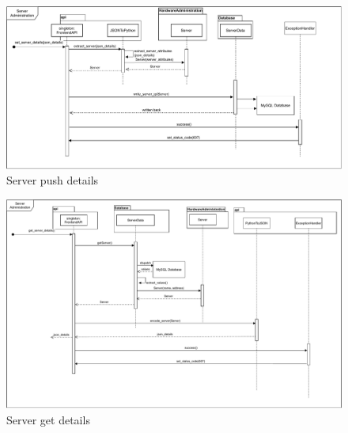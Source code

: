 \begin{figure}[H]
	\includegraphics[width=1\textwidth]{res/Server_Sequence.drawio.pdf} 
	\caption{Server push details}
\end{figure}
\begin{figure}[H]
	\includegraphics[width=1\textwidth]{res/server_get.drawio.pdf} 
	\caption{Server get details}
\end{figure}
